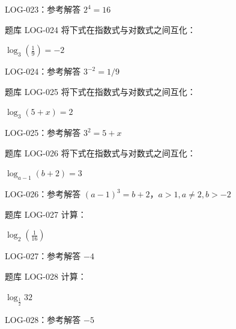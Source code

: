 \documentclass[aspectratio=169,10pt]{beamer}
\begin{document}
\ifdefined\TeacherEdition
\begin{frame}[t]{LOG-023：参考解答}
$2^4=16$
\end{frame}
\fi

\begin{campuspractice}{题库 LOG-024}
将下式在指数式与对数式之间互化：\par
$\log_3(\frac{1}{9})=-2$
\end{campuspractice}

\ifdefined\TeacherEdition
\begin{frame}[t]{LOG-024：参考解答}
$3^{-2}=1/9$
\end{frame}
\fi

\begin{campuspractice}{题库 LOG-025}
将下式在指数式与对数式之间互化：\par
$\log_3(5+x)=2$
\end{campuspractice}

\ifdefined\TeacherEdition
\begin{frame}[t]{LOG-025：参考解答}
$3^2=5+x$
\end{frame}
\fi

\begin{campuspractice}{题库 LOG-026}
将下式在指数式与对数式之间互化：\par
$\log_{a-1}(b+2)=3$
\end{campuspractice}

\ifdefined\TeacherEdition
\begin{frame}[t]{LOG-026：参考解答}
$(a-1)^3=b+2$，$a>1,a\ne2,b>-2$
\end{frame}
\fi

\begin{campuspractice}{题库 LOG-027}
计算：\par
$\log_2(\frac{1}{16})$
\end{campuspractice}

\ifdefined\TeacherEdition
\begin{frame}[t]{LOG-027：参考解答}
$-4$
\end{frame}
\fi

\begin{campuspractice}{题库 LOG-028}
计算：\par
$\log_{\frac{1}{2}}32$
\end{campuspractice}

\ifdefined\TeacherEdition
\begin{frame}[t]{LOG-028：参考解答}
$-5$
\end{frame}
\fi
\end{document}
